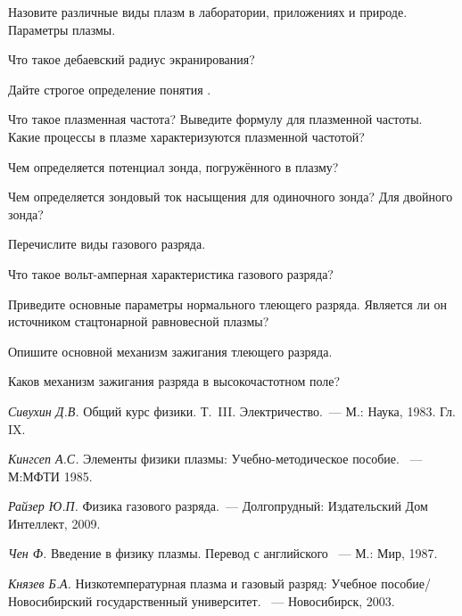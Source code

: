 \begin{lab:questions}

\item Назовите различные виды плазм в лаборатории, приложениях и природе. Параметры плазмы.

\item Что такое дебаевский радиус экранирования?

\item Дайте строгое определение понятия .

\item Что такое плазменная частота? Выведите формулу для плазменной частоты. Какие процессы в плазме характеризуются плазменной частотой?

\item Чем определяется потенциал зонда, погружённого в плазму?

\item Чем определяется зондовый ток насыщения для одиночного зонда? Для двойного зонда?

\item Перечислите виды газового разряда.

\item Что такое вольт-амперная характеристика газового разряда?

\item Приведите основные параметры нормального тлеющего разряда. Является ли он источником стацтонарной равновесной плазмы?

\item Опишите основной механизм зажигания тлеющего разряда.

\item Каков механизм зажигания разряда в высокочастотном поле?

\end{lab:questions}


\begin{lab:literature}

\item \emph{Сивухин Д.В.} Общий курс физики. Т.~III. Электричество.~--- М.: Наука, 1983. Гл. IX.

\item \emph{Кингсеп А.С.} Элементы физики плазмы: Учебно-методическое пособие. ~--- М:МФТИ 1985.

\item \emph{Райзер Ю.П.} Физика газового разряда.~--- Долгопрудный: Издательский Дом Интеллект, 2009.

\item \emph{Чен Ф.} Введение в физику плазмы. Перевод с английского ~--- М.: Мир, 1987.

\item \emph{Князев Б.А.} Низкотемпературная плазма и газовый разряд: Учебное пособие/ Новосибирский государственный университет. ~--- Новосибирск, 2003.
\end{lab:literature}
